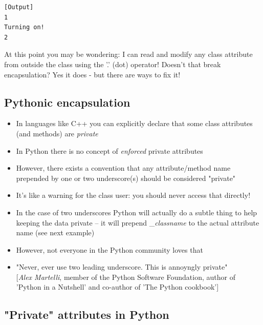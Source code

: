 \inputminted{python}{snippets/class_tv_zapping.py}

\begin{verbatim}
[Output]
1
Turning on!
2
\end{verbatim}

At this point you may be wondering: I can read and modify any class attribute from outside the class using the ’.’ (dot) operator!
Doesn’t that break encapsulation?
Yes it does - but there are ways to fix it!

\subsection{Pythonic encapsulation}


  \begin{itemize}
    \item In languages like C++ you can explicitly declare that some class
          attributes (and methods) are \emph{private}
    \smallskip
    \item In Python there is no concept of \emph{enforced} private attributes
    \smallskip
    \item However, there exists a convention that any attribute/method name prepended by one or two underscore(s) should be considered "private"
    \smallskip
    \item It's like a warning for the class user: you should never access that directly!
    \smallskip
    \item In the case of two underscores Python will actually do a subtle thing to help keeping the data private -- it will 
          prepend \_\emph{classname} to the actual attribute name (see next example)
    \smallskip
    \item However, not everyone in the Python community loves that
    \smallskip
    \item "Never, ever use two leading underscore. This is annoyngly private"\\
           \vspace{0.02\textheight}
           \footnotesize [\emph{Alex Martelli}, member of the Python Software Foundation, author of 'Python in a Nutshell' and co-author of 'The Python cookbook']
  \end{itemize}
  
\subsection{"Private" attributes in Python}

